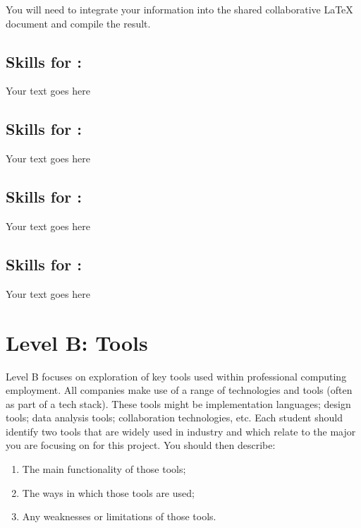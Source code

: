 \documentclass[a4paper, 11pt]{report}
\begin{document}
You will need to integrate your information into the shared collaborative LaTeX document and compile the result.

\subsection{Skills for \majA: \studA}

Your text goes here

\subsection{Skills for \majB: \studB}

Your text goes here

\subsection{Skills for \majC: \studC}

Your text goes here

\subsection{Skills for \majD: \studD}

Your text goes here



\newpage
\section{Level B: Tools}

Level B focuses on exploration of key tools used within professional computing employment. All companies make use of a range of technologies and tools (often as part of a tech stack). These tools might be implementation languages; design tools; data analysis tools; collaboration technologies, etc. Each student should identify two tools that are widely used in industry and which relate to the major you are focusing on for this project. You should then describe:
\begin{enumerate}
	\item The main functionality of those tools;
	\item The ways in which those tools are used;
	\item Any weaknesses or limitations of those tools.
\end{enumerate}
\end{document}

